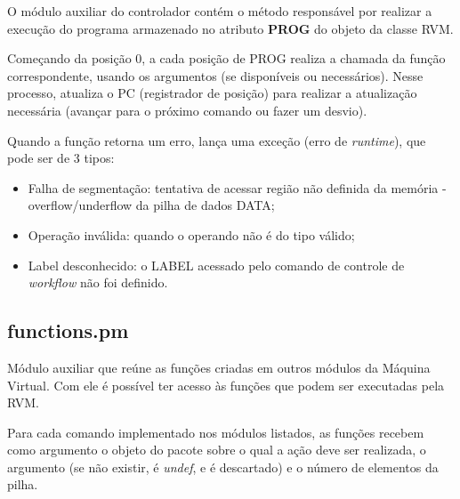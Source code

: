 \documentclass[a4paper]{article}
\begin{document}
        O módulo auxiliar do controlador contém o método responsável 
        por realizar a execução do programa armazenado no atributo 
        \textbf{PROG} do objeto da classe RVM. 
        
        Começando da posição 0, a cada posição de PROG realiza a 
        chamada da função correspondente, usando os argumentos (se 
        disponíveis ou necessários). Nesse processo, atualiza o PC 
        (registrador de posição) para realizar a atualização 
        necessária (avançar para o próximo comando ou fazer um desvio).
        
        Quando a função retorna um erro, lança uma exceção (erro de 
        \emph{runtime}), que pode ser de 3 tipos:
        \begin{itemize}
            
            \item Falha de segmentação: tentativa de acessar região 
                                        não definida da memória -
                                        overflow/underflow da
                                        pilha de dados DATA;
                                        
            \item Operação inválida:    quando o operando não é do tipo 
                                        válido;
                                        
            \item Label desconhecido:   o LABEL acessado pelo comando 
                                        de controle de \emph{workflow} 
                                        não foi definido.
                                        
        \end{itemize}
        
    \subsection{functions.pm}
        
        Módulo auxiliar que reúne as funções criadas em outros módulos 
        da Máquina Virtual. Com ele é possível ter acesso às funções 
        que podem ser executadas pela RVM.        
        
        Para cada comando implementado nos módulos listados, as funções
        recebem como argumento o objeto do pacote sobre o qual a ação 
        deve ser realizada, o argumento (se não existir, é \emph{undef},
        e é descartado) e o número de elementos da pilha.
        
\end{document}
